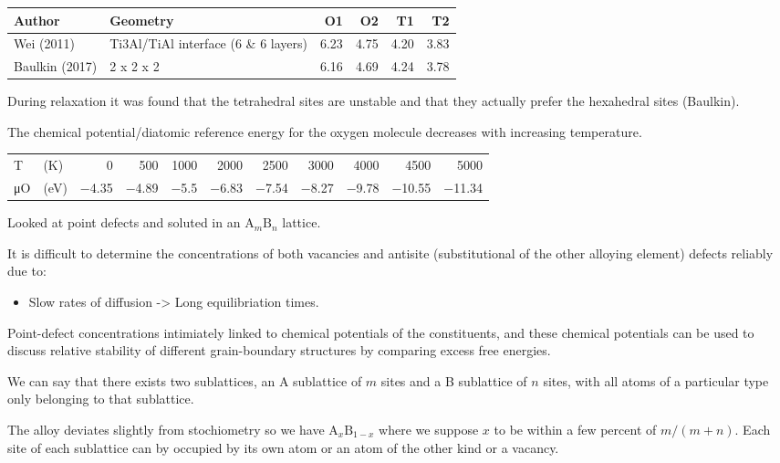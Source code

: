 \documentclass[11pt]{article}
\begin{document}
\begin{center}
\begin{tabular}{llrrrr}
Author & Geometry & O1 & O2 & T1 & T2\\
\hline
Wei     (2011) & Ti3Al/TiAl interface (6 \& 6 layers) & 6.23 & 4.75 & 4.20 & 3.83\\
Baulkin (2017) & 2 x 2 x 2 & 6.16 & 4.69 & 4.24 & 3.78\\
\end{tabular}
\end{center}

During relaxation it was found that the tetrahedral sites are unstable and
that they actually prefer the hexahedral sites (Baulkin). 

The chemical potential/diatomic reference energy for the oxygen molecule
decreases with increasing temperature. 
\begin{center}
\begin{tabular}{llrrrrrrrrr}
\hline
T & (K) & 0 & 500 & 1000 & 2000 & 2500 & 3000 & 4000 & 4500 & 5000\\
μO & (eV) & −4.35 & −4.89 & −5.5 & −6.83 & −7.54 & −8.27 & −9.78 & −10.55 & −11.34\\
\end{tabular}
\end{center}


\cite{hagen98_point_defec_chemic_poten_order_alloy}

Looked at point defects and soluted in an \(\text{A}_m\text{B}_n\) lattice. 

It is difficult to determine the concentrations of both vacancies and antisite
(substitutional of the other alloying element) defects reliably due to:
\begin{itemize}
\item Slow rates of diffusion -> Long equilibriation times.
\end{itemize}

Point-defect concentrations intimiately linked to chemical potentials of the
constituents, and these chemical potentials can be used to discuss relative
stability of different grain-boundary structures by comparing excess free
energies. 

We can say that there exists two sublattices, an A sublattice of \(m\) sites and a B
sublattice of \(n\) sites, with all atoms of a particular type only belonging to that
sublattice. 

The alloy deviates slightly from stochiometry so we have
\(\text{A}_{x}\text{B}_{1-x}\) where we suppose \(x\) to be within a few percent
of \(m/(m+n)\). Each site of each sublattice can by occupied by its own atom or
an atom of the other kind or a vacancy.
\end{document}
